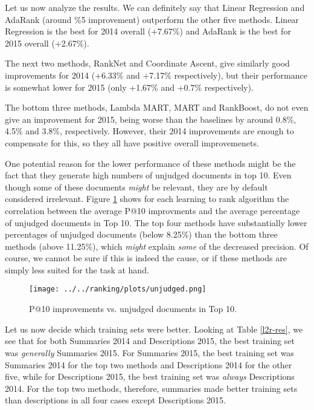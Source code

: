 Let us now analyze the results. We can definitely say that Linear Regression and AdaRank (around \%5 improvement)
outperform the other five methods. Linear Regression is the best for 2014 overall (+7.67\%) and 
AdaRank is the best for 2015 overall (+2.67\%).

The next two methods, RankNet and Coordinate Ascent, give similarly good
improvements for 2014 (+6.33\% and +7.17\% respectively), but their performance is somewhat lower
for 2015 (only +1.67\% and +0.7\% respectively).

The bottom three methods, Lambda MART, MART and RankBoost, do not even give an improvement for 2015, being worse
than the baselines by around 0.8\%, 4.5\% and 3.8\%, respectively. However, their 2014 improvements are enough to compensate
for this, so they all have positive overall improvemenets.

One potential reason for the lower performance of these methods might be the fact that they generate high
numbers of unjudged documents in top 10. Even though some of these documents \emph{might} be relevant,
they are by default considered irrelevant.
Figure \ref{unjudged-fig} shows for each learning to rank algorithm
the correlation between the average P@10 improvments and the average 
percentage of unjudged documents in Top 10. The top four methods
have substantially lower percentages of unjudged documents (below 8.25\%) than the bottom
three methods (above 11.25\%), which \emph{might} explain \emph{some} of the decreased precision. 
Of course, we cannot
be sure if this is indeed the cause, or if these methods are simply less suited for the task at hand.

\begin{figure}[h!]
\centerline{
  \texttt{[image: ../../ranking/plots/unjudged.png]}
  }
  \caption{P@10 improvements vs. unjudged documents in Top 10.}
  \label{unjudged-fig}
\end{figure}

Let us now decide which training sets were better.
Looking at Table \ref{l2r-res}, we see that for both Summaries 2014 and Descriptions 2015, the best
training set was \emph{generally} Summaries 2015. 
For Summaries 2015, the best training set 
was Summaries 2014 for the top two methods and Descriptions 2014 for the other five,
while for Descriptions 2015, the best training set was \emph{always} Descriptions 2014.
For the top two methods, therefore, summaries made better training sets than descriptions in all
four cases except Descriptions 2015.

